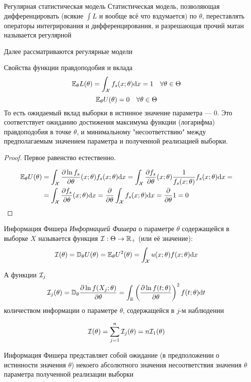 \begin{dfn}{Регулярная статистическая модель}
Статистическая модель,
позволяющая
дифференцировать (всякие $\int L$ и вообще всё что вздумается) по $\theta$,
переставлять операторы интегрирования и дифференцирования,
и разрешающая прочий матан называется регулярной

Далее рассматриваются регулярные модели
\end{dfn}

\begin{thm}{Свойства функции правдоподобия и вклада}
$$\mathbb E_\theta L(\theta) = \int_\mathcal X f_s(x;\theta) \mathrm d x = 1 \quad\forall\theta\in\Theta$$
$$\mathbb E_\theta U(\theta) = 0 \quad\forall\theta\in\Theta$$
То есть ожидаемый вклад выборки в истинное значение параметра --- 0.
Это соответствует ожиданию достижения максимума функции (логарифма) правдоподобия в точке $\theta$,
и минимальному "несоответствию" между предполагаемым значением параметра и полученной реализацией выборки.
\end{thm}
\begin{proof}
Первое равенство естественно.

$$\begin{aligned}
\mathbb E_\theta U(\theta)
&= \int_\mathcal X \frac{\partial\ln f_s}{\partial\theta}(x;\theta) f_s(x;\theta)\mathrm d x
 = \int_\mathcal X \frac{\partial f_s}{\partial\theta}(x;\theta) \frac1{f_s(x;\theta)} f_s(x;\theta)\mathrm d x=\\
&= \int_\mathcal X \frac{\partial f_s}{\partial\theta}(x;\theta)\mathrm d x
 = \frac{\partial}{\partial\theta} \int_\mathcal X f_s(x;\theta)\mathrm d x
 = \frac{\partial}{\partial\theta} 1
 = 0
\end{aligned}$$
\end{proof}

\begin{dfn}{Информация Фишера}
\emph{Информацией Фишера}
о параметре $\theta$
содержащейся в выборке $X$
называется функция $\mathcal I:\Theta\to\mathbb R_+$ (или её значение):
$$\mathcal I(\theta) = \mathbb D_\theta U(\theta) = \mathbb E_\theta U^2(\theta) = \int_\mathcal X u(x;\theta) f(x;\theta) \mathrm d x$$

А функции $\mathcal I_j$
$$\mathcal I_j(\theta)
= \mathbb D_\theta \frac{\partial\ln f(X_j;\theta)}{\partial\theta}
= \int_\mathbb R \left(\frac{\partial\ln f(t;\theta)}{\partial\theta}\right)^2 f(t;\theta) \mathrm d t $$
количеством информации о параметре $\theta$,
содержащейся в $j$-м наблюдении

$$\mathcal I(\theta) = \sum_{j=1}^n \mathcal I_j(\theta) = n\mathcal I_1(\theta)$$

Информация Фишера
представляет собой ожидание (в предположении о истинности значения $\theta$)
некоего абсолютного значения несоответствия значения $\theta$ параметра
полученной реализации выборки
\end{dfn}

